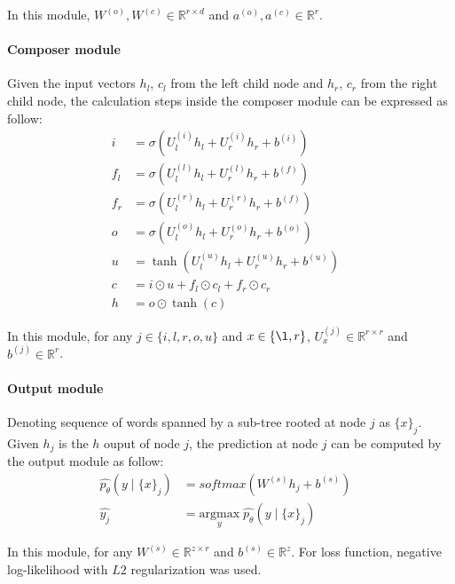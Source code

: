 In this module, \(W^{(o)}, W^{(c)} \in \mathbb{R}^{r \times d}\) and \(a^{\left(o\right)}, a^{(c)} \in \mathbb{R}^r\).

\paragraph{Composer module}
Given the input vectors \({h_l}\), \({c_l}\) from the left child node and \({h_r}\), \({c_r}\) from the right child node, the calculation steps inside the composer module can be expressed as follow:
\begin{align}
      i &= \sigma{ \left(U_l^{(i)} h_{l} + U_r^{(i)} h_{r} + b^{(i)} \right) } &\\
      f_{l} &= \sigma{\left(U_{l}^{(l)} h_{l} + U_{r}^{(l)} h_{r} + b^{(f)}\right)} & \\
      f_{r} &= \sigma{\left(U_{l}^{(r)} h_{l} + U_{r}^{(r)} h_{r} + b^{(f)}\right)} & \\
      o &= \sigma{\left( U_l^{(o)} h_{l} + U_r^{(o)} h_{r} + b^{(o)}\right)} &\\
      u &= \tanh{\left( U_l^{(u)} h_{l} + U_r^{(u)} h_{r} + b^{(u)}\right)} &\\
       c &= i \odot u + f_{l} \odot c_{l} + f_{r} \odot c_{r} & \\
    h &= o \odot \tanh{\left(c\right)} &
\end{align}

In this module, for any \(j \in \{i, l, r, o, u\}\) and \(x \in \{\l, r\}\), \(U_x^{(j)} \in \mathbb{R}^{r \times r}\) and \( b^{(j)} \in \mathbb{R}^r\).

\paragraph{Output module} Denoting sequence of words spanned by a sub-tree rooted at node \({j}\) as \({\{x\}_j}\).
Given \({h_j}\) is the \({h}\) ouput of node \({j}\), the prediction at node \({j}\) can be computed by the output module as follow:
\begin{align}
      \hat{p_{\theta}}(y \mid \{x\}_j ) &= softmax( W^{(s)} h_j + b^{(s)}) & \\
      \hat{y_j} &= \underset{y}{\mathrm{argmax}} \; \hat{p_{\theta}}(y \mid \{x\}_j ) &
\end{align}

In this module, for any \(W^{(s)} \in \mathbb{R}^{z \times r}\) and \( b^{(s)} \in \mathbb{R}^z\).
For loss function, negative log-likelihood with \(L2\) regularization was used.

